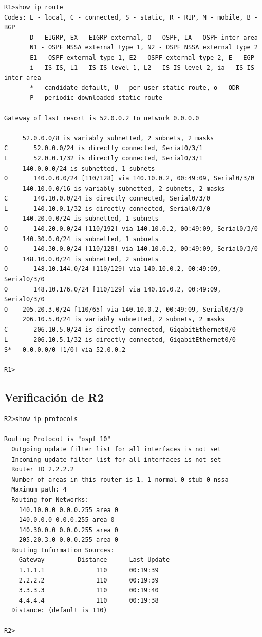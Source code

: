 \documentclass[12pt,a4paper]{article}
\begin{document}
\begin{verbatim}
R1>show ip route
Codes: L - local, C - connected, S - static, R - RIP, M - mobile, B - BGP
       D - EIGRP, EX - EIGRP external, O - OSPF, IA - OSPF inter area
       N1 - OSPF NSSA external type 1, N2 - OSPF NSSA external type 2
       E1 - OSPF external type 1, E2 - OSPF external type 2, E - EGP
       i - IS-IS, L1 - IS-IS level-1, L2 - IS-IS level-2, ia - IS-IS inter area
       * - candidate default, U - per-user static route, o - ODR
       P - periodic downloaded static route

Gateway of last resort is 52.0.0.2 to network 0.0.0.0

     52.0.0.0/8 is variably subnetted, 2 subnets, 2 masks
C       52.0.0.0/24 is directly connected, Serial0/3/1
L       52.0.0.1/32 is directly connected, Serial0/3/1
     140.0.0.0/24 is subnetted, 1 subnets
O       140.0.0.0/24 [110/128] via 140.10.0.2, 00:49:09, Serial0/3/0
     140.10.0.0/16 is variably subnetted, 2 subnets, 2 masks
C       140.10.0.0/24 is directly connected, Serial0/3/0
L       140.10.0.1/32 is directly connected, Serial0/3/0
     140.20.0.0/24 is subnetted, 1 subnets
O       140.20.0.0/24 [110/192] via 140.10.0.2, 00:49:09, Serial0/3/0
     140.30.0.0/24 is subnetted, 1 subnets
O       140.30.0.0/24 [110/128] via 140.10.0.2, 00:49:09, Serial0/3/0
     148.10.0.0/24 is subnetted, 2 subnets
O       148.10.144.0/24 [110/129] via 140.10.0.2, 00:49:09, Serial0/3/0
O       148.10.176.0/24 [110/129] via 140.10.0.2, 00:49:09, Serial0/3/0
O    205.20.3.0/24 [110/65] via 140.10.0.2, 00:49:09, Serial0/3/0
     206.10.5.0/24 is variably subnetted, 2 subnets, 2 masks
C       206.10.5.0/24 is directly connected, GigabitEthernet0/0
L       206.10.5.1/32 is directly connected, GigabitEthernet0/0
S*   0.0.0.0/0 [1/0] via 52.0.0.2

R1>
\end{verbatim}

\subsection{Verificación de R2}

\begin{verbatim}
R2>show ip protocols

Routing Protocol is "ospf 10"
  Outgoing update filter list for all interfaces is not set 
  Incoming update filter list for all interfaces is not set 
  Router ID 2.2.2.2
  Number of areas in this router is 1. 1 normal 0 stub 0 nssa
  Maximum path: 4
  Routing for Networks:
    140.10.0.0 0.0.0.255 area 0
    140.0.0.0 0.0.0.255 area 0
    140.30.0.0 0.0.0.255 area 0
    205.20.3.0 0.0.0.255 area 0
  Routing Information Sources:  
    Gateway         Distance      Last Update 
    1.1.1.1              110      00:19:39
    2.2.2.2              110      00:19:39
    3.3.3.3              110      00:19:40
    4.4.4.4              110      00:19:38
  Distance: (default is 110)

R2>
\end{verbatim}
\end{document}
